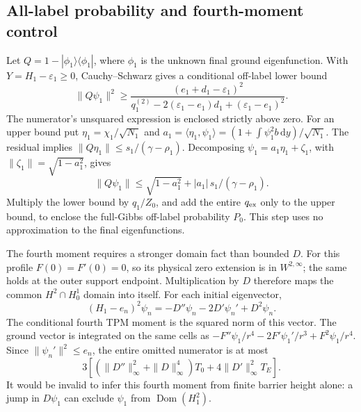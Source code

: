 \documentclass[aps,pra,reprint,superscriptaddress,longbibliography]{revtex4-2}
\newcommand{\dd}{\mathrm d}
\begin{document}
\subsection{All-label probability and fourth-moment control}

Let $Q=1-|\phi_1\rangle\langle\phi_1|$, where $\phi_1$ is the unknown
final ground eigenfunction.  With $Y=H_1-\varepsilon_1\ge0$,
Cauchy--Schwarz gives a conditional off-label lower bound
\begin{equation}
 \|Q\psi_1\|^2\ge
 \frac{(e_1+d_1-\varepsilon_1)^2}
 {q_1^{(2)}-2(\varepsilon_1-e_1)d_1+(\varepsilon_1-e_1)^2}.
 \label{eq:nc-offlower}
\end{equation}
The numerator's unsquared expression is enclosed strictly above zero.
For an upper bound put $\eta_1=\chi_1/\sqrt{N_1}$ and
$a_1=\langle\eta_1,\psi_1\rangle
=(1+\int\psi_1^2b\,\dd y)/\sqrt{N_1}$.
The residual implies $\|Q\eta_1\|\le s_1/(\gamma-\rho_1)$.
Decomposing $\psi_1=a_1\eta_1+\zeta_1$, with
$\|\zeta_1\|=\sqrt{1-a_1^2}$, gives
\begin{equation}
 \|Q\psi_1\|\le
 \sqrt{1-a_1^2}+|a_1|\,s_1/(\gamma-\rho_1).
 \label{eq:nc-offupper}
\end{equation}
Multiply the lower bound by $q_1/Z_0$, and add the entire
$q_{\rm ex}$ only to the upper bound, to enclose the full-Gibbs
off-label probability $P_0$.  This step uses no approximation to
the final eigenfunctions.

The fourth moment requires a stronger domain fact than bounded $D$.
For this profile $F(0)=F'(0)=0$, so its physical zero extension is in
$W^{2,\infty}$; the same holds at the outer support endpoint.
Multiplication by $D$ therefore maps the common $H^2\cap H_0^1$
domain into itself.  For each initial eigenvector,
\begin{equation}
 (H_1-e_n)^2\psi_n=-D''\psi_n-2D'\psi_n'+D^2\psi_n.
 \label{eq:nc-fourth-vector}
\end{equation}
The conditional fourth TPM moment is the squared norm of this vector.
The ground vector is integrated on the same cells as
$-F''\psi_1/r^4-2F'\psi_1'/r^3+F^2\psi_1/r^4$.
Since $\|\psi_n'\|^2\le e_n$, the entire omitted numerator is at most
\begin{equation}
 3\left[(\|D''\|_\infty^2+\|D\|_\infty^4)T_0
                  +4\|D'\|_\infty^2T_E\right].
 \label{eq:nc-fourth-tail}
\end{equation}
It would be invalid to infer this fourth moment from finite barrier
height alone: a jump in $D\psi_1$ can exclude $\psi_1$ from
$\operatorname{Dom}(H_1^2)$.
\end{document}
